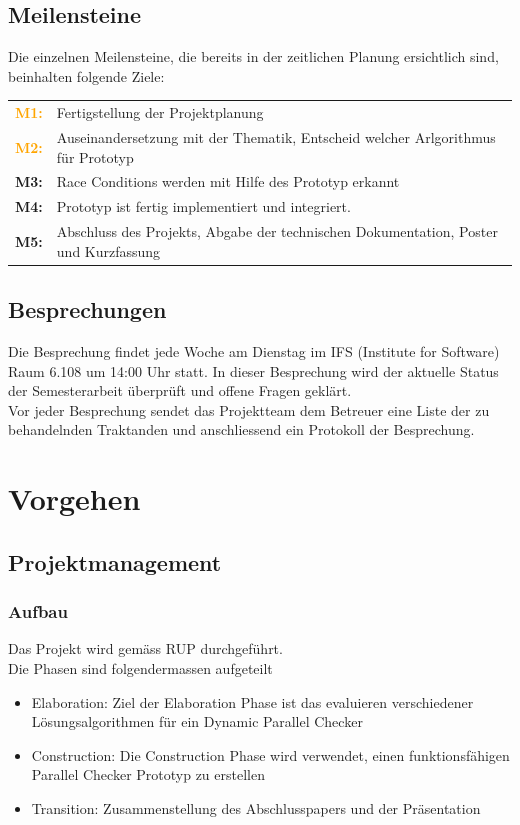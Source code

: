 \documentclass[10pt,a4paper]{article}
\begin{document}
\subsection{Meilensteine}
\begin{flushleft}
	Die einzelnen Meilensteine, die bereits in der zeitlichen Planung ersichtlich sind, beinhalten folgende Ziele:
\end{flushleft}
\begin{tabular}{cl}
	\textcolor{Orange}{\textbf{M1:}} & Fertigstellung der Projektplanung\\[0.2cm]
	\textcolor{Orange}{\textbf{M2:}} & Auseinandersetzung mit der Thematik, Entscheid welcher Arlgorithmus für Prototyp\\[0.2cm]
	\textcolor{NavyBlue}{\textbf{M3:}} & Race Conditions werden mit Hilfe des Prototyp erkannt\\[0.2cm]
	\textcolor{NavyBlue}{\textbf{M4:}} & Prototyp ist fertig implementiert und integriert.\\[0.2cm]
	\textcolor{Dandelion}{\textbf{M5:}} & Abschluss des Projekts, Abgabe der technischen Dokumentation, Poster und Kurzfassung\\
\end{tabular}
\subsection{Besprechungen}
\begin{flushleft}
	Die Besprechung findet jede Woche am Dienstag im IFS (Institute for Software) Raum 6.108 um 14:00 Uhr statt. In dieser Besprechung wird der aktuelle Status der Semesterarbeit überprüft und offene Fragen geklärt.\\
	Vor jeder Besprechung sendet das Projektteam dem Betreuer eine Liste der zu behandelnden Traktanden und anschliessend ein Protokoll der Besprechung.
\end{flushleft}
\newpage
\section{Vorgehen}
\subsection{Projektmanagement}
\subsubsection{Aufbau}
Das Projekt wird gemäss RUP durchgeführt.\\
Die Phasen sind folgendermassen aufgeteilt\\
\begin{itemize}
	\item Elaboration: Ziel der Elaboration Phase ist das evaluieren verschiedener Lösungsalgorithmen für ein Dynamic Parallel Checker
	\item Construction: Die Construction Phase wird verwendet, einen funktionsfähigen Parallel Checker Prototyp zu erstellen
	\item Transition: Zusammenstellung des Abschlusspapers und der Präsentation
\end{itemize}
\end{document}
